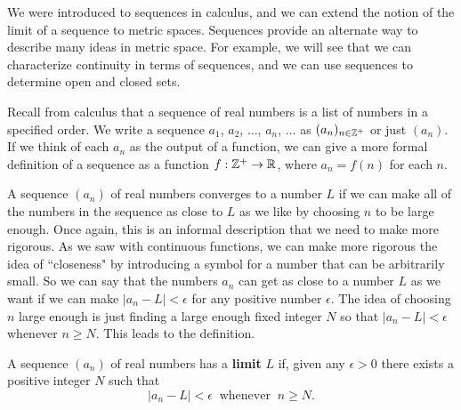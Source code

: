 \label{chap:sequences}

\vspace*{-17 pt}

\vspace*{13 pt}

\label{sec_seq_intro}

We were introduced to sequences in calculus, and we can extend the notion of the limit of a sequence to metric spaces. Sequences provide an alternate way to describe many ideas in metric space. For example, we will see that we can characterize continuity in terms of sequences, and we can use sequences to determine open and closed sets. 

Recall from calculus that a sequence of real numbers is a list of numbers in a specified order. We write a sequence $a_1$, $a_2$, $\ldots$, $a_n$, $\ldots$ as $(a_n)_{n \in \mathbb{Z}^+}$ or just $(a_n)$. If we think of each $a_n$ as the output of a function, we can give a more formal definition of a sequence as a function $f: \mathbb{Z}^+ \to \mathbb{R}$, where $a_n = f(n)$ for each $n$. 

A sequence $(a_n)$ of real numbers converges to a number $L$ if we can make all of the numbers in the sequence as close to $L$ as we like by choosing $n$ to be large enough. Once again, this is an informal description that we need to make more rigorous. As we saw with continuous functions, we can make more rigorous the idea of ``closeness" by introducing a symbol for a number that can be arbitrarily small. So we can say that the numbers $a_n$ can get as close to a number $L$ as we want if we can make $| a_n - L | < \epsilon$ for any positive number $\epsilon$. The idea of choosing $n$ large enough is just finding a large enough fixed integer $N$ so that $| a_n - L | < \epsilon$ whenever $n \geq N$. This leads to the definition.

\begin{definition} \label{def:sequence_limit_real} A sequence $(a_n)$ of real numbers has a \textbf{limit} $L$ if, given any $\epsilon > 0$ there exists a positive integer $N$ such that 
\[| a_n - L | < \epsilon \ \text{ whenever } \ n \geq N.\]
\end{definition}

